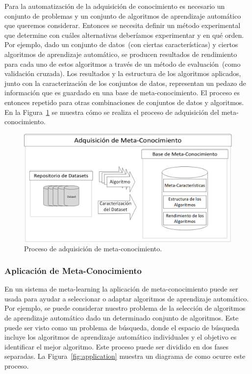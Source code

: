 Para la automatización de la adquisición de conocimiento es necesario un
conjunto de problemas y un conjunto de algoritmos de aprendizaje automático
que queremos considerar. Entonces se necesita definir un método experimental
que determine con cuáles alternativas deberíamos experimentar y en qué orden.
Por ejemplo, dado un conjunto de datos~(con ciertas características) y
ciertos algoritmos de aprendizaje automático, se producen resultados de
rendimiento para cada uno de estos algoritmos a través de un método de
evaluación~(como validación cruzada). Los resultados y la estructura de los
algoritmos aplicados, junto con la caracterización de los conjuntos de datos,
representan un pedazo de información que es guardado en una base de
meta-conocimiento. El proceso es entonces repetido para otras combinaciones de
conjuntos de datos y algoritmos. 
En la Figura~\ref{fig:adquisition} se muestra cómo se realiza el proceso de
adquisición del meta-conocimiento.

\begin{figure}[H]
    \centering
    \includegraphics[scale=.5]{Figures/adquisition.png}
    \caption{Proceso de adquisición de meta-conocimiento. }
    \label{fig:adquisition}
\end{figure}

\subsubsection{Aplicación de Meta-Conocimiento}

En un sistema de meta-learning la aplicación de meta-conocimiento puede ser
usada para ayudar a seleccionar o adaptar algoritmos de aprendizaje automático.
Por ejemplo, se puede considerar nuestro problema de la selección de algoritmos
de aprendizaje automático dado un determinado conjunto de algoritmos. Este
puede ser visto como un problema de búsqueda, donde el espacio de búsqueda
incluye los algoritmos de aprendizaje automático individuales y el objetivo es
identificar el mejor algoritmo. Este proceso puede ser dividido en dos fases
separadas. La Figura~\ref{fig:application} muestra un diagrama de como ocurre
este proceso.


